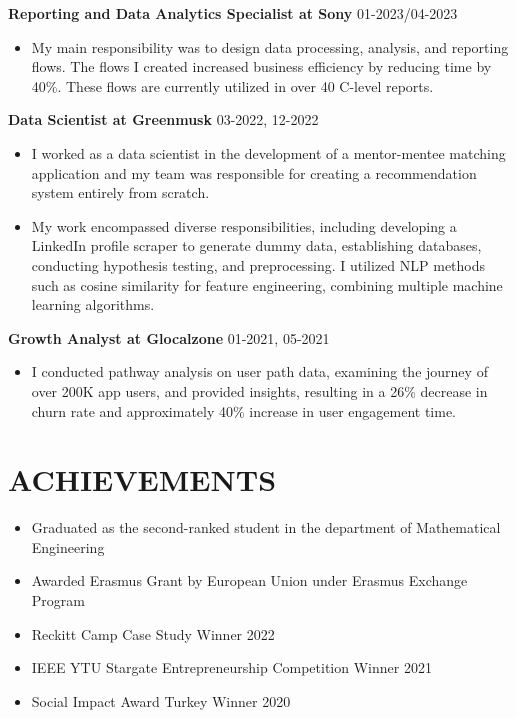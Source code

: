 \documentclass[a4paper,9pt]{extarticle}
\begin{document}
\noindent
\textbf{Reporting and Data Analytics Specialist at Sony} \hfill 01-2023/04-2023 
\begin{itemize}
    \item My main responsibility was to design data processing, analysis, and reporting flows. The flows I created increased business efficiency by reducing time by 40\%. These flows are currently utilized in over 40 C-level reports. 
\end{itemize}

\noindent
\textbf{Data Scientist at Greenmusk} \hfill 03-2022, 12-2022 
\begin{itemize}
    \item I worked as a data scientist in the development of a mentor-mentee matching application and my team was responsible for creating a recommendation system entirely from scratch. %
    \item My work encompassed diverse responsibilities, including developing a LinkedIn profile scraper to generate dummy data, establishing databases, conducting hypothesis testing, and preprocessing. I utilized NLP methods such as cosine similarity for feature engineering, combining multiple machine learning algorithms.
\end{itemize}

\noindent
\textbf{Growth Analyst at Glocalzone} \hfill 01-2021, 05-2021 
\begin{itemize}
    \item I conducted pathway analysis on user path data, examining the journey of over 200K app users, and provided insights, resulting in a 26\% decrease in churn rate and approximately 40\% increase in user engagement time.
\end{itemize}

\section*{ACHIEVEMENTS}
\begin{itemize}
    \item Graduated as the second-ranked student in the department of Mathematical Engineering
    \item Awarded Erasmus Grant by European Union under Erasmus Exchange Program
    \item Reckitt Camp Case Study Winner 2022
    \item IEEE YTU Stargate Entrepreneurship Competition Winner 2021
    \item Social Impact Award Turkey Winner 2020
\end{itemize}
\end{document}

